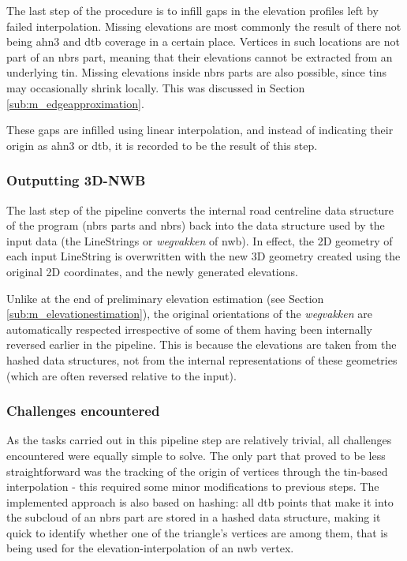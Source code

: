 The last step of the procedure is to infill gaps in the elevation profiles left by failed interpolation. Missing elevations are most commonly the result of there not being \ac{ahn3} and \ac{dtb} coverage in a certain place. Vertices in such locations are not part of an \ac{nbrs} part, meaning that their elevations cannot be extracted from an underlying \ac{tin}. Missing elevations inside \ac{nbrs} parts are also possible, since \ac{tin}s may occasionally shrink locally. This was discussed in Section \ref{sub:m_edgeapproximation}.

These gaps are infilled using linear interpolation, and instead of indicating their origin as \ac{ahn3} or \ac{dtb}, it is recorded to be the result of this step.

\subsubsection{Outputting 3D-NWB}

The last step of the pipeline converts the internal road centreline data structure of the program (\ac{nbrs} parts and \ac{nbrs}) back into the data structure used by the input data (the LineStrings or \textit{wegvakken} of \ac{nwb}). In effect, the 2D geometry of each input LineString is overwritten with the new 3D geometry created using the original 2D coordinates, and the newly generated elevations.

Unlike at the end of preliminary elevation estimation (see Section \ref{sub:m_elevationestimation}), the original orientations of the \textit{wegvakken} are automatically respected irrespective of some of them having been internally reversed earlier in the pipeline. This is because the elevations are taken from the hashed data structures, not from the internal representations of these geometries (which are often reversed relative to the input).

\subsubsection{Challenges encountered}

As the tasks carried out in this pipeline step are relatively trivial, all challenges encountered were equally simple to solve. The only part that proved to be less straightforward was the tracking of the origin of vertices through the \ac{tin}-based interpolation - this required some minor modifications to previous steps. The implemented approach is also based on hashing: all \ac{dtb} points that make it into the subcloud of an \ac{nbrs} part are stored in a hashed data structure, making it quick to identify whether one of the triangle's vertices are among them, that is being used for the elevation-interpolation of an \ac{nwb} vertex.

